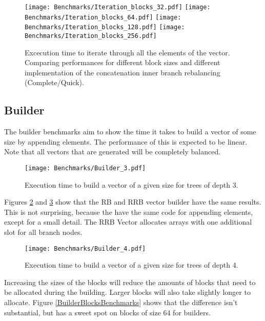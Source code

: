 \begin{figure}[h!]
  \centering
  \texttt{[image: Benchmarks/Iteration\_blocks\_32.pdf]}
  \texttt{[image: Benchmarks/Iteration\_blocks\_64.pdf]}
  \texttt{[image: Benchmarks/Iteration\_blocks\_128.pdf]}
  \texttt{[image: Benchmarks/Iteration\_blocks\_256.pdf]}
  \caption{Excecution time to iterate through all the elements of the vector. Comparing performances for different block sizes and different implementation of the concatenation inner branch rebalancing (Complete/Quick).}
  \label{IterationBlocksBenchmarks}
\end{figure}

\FloatBarrier

\subsection{Builder}
The builder benchmarks aim to show the time it takes to build a vector of some size by appending elements. The performance of this is expected to be linear. Note that all vectors that are generated will be completely balanced.


\begin{figure}[h!]
  \centering
  \texttt{[image: Benchmarks/Builder\_3.pdf]}
  \caption{Execution time to build a vector of a given size for trees of depth 3.}
    \label{Builder3Benchmarks}
\end{figure}

Figures \ref{Builder3Benchmarks} and \ref{Builder4Benchmarks} show that the RB and RRB vector builder have the same results. This is not surprising, because the have the same code for appending elements, except for a small detail. The RRB Vector allocates arrays with one additional slot for all branch nodes.

\begin{figure}[h!]
  \centering
  \texttt{[image: Benchmarks/Builder\_4.pdf]}
  \caption{Execution time to build a vector of a given size for trees of depth 4.}
   \label{Builder4Benchmarks}
\end{figure}

\FloatBarrier

Increasing the sizes of the blocks will reduce the amounts of blocks that need to be allocated during the building. Larger blocks will also take slightly longer to allocate. Figure \ref{BuilderBlocksBenchmarks} shows that the difference isn't substantial, but has a sweet spot on blocks of size 64 for builders.

